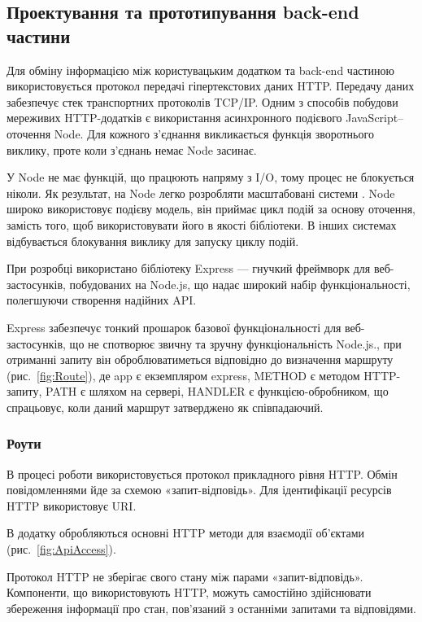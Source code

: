 \subsection{Проектування та прототипування back-end частини}

Для обміну інформацією між користувацьким додатком та back-end частиною використовується протокол передачі гіпертекстових даних HTTP. Передачу даних забезпечує стек транспортних протоколів TCP/IP.
Одним з способів побудови мереживих HTTP-додатків є використання  асинхронного подієвого JavaScript–оточення Node. Для кожного з’єднання викликається функція зворотнього виклику, проте коли з’єднань немає Node засинає.

У Node не має функцій, що працюють напряму з I/O, тому процес не блокується ніколи. Як результат, на Node легко розробляти масштабовані системи \cite{zeiss2015node}.
Node широко використовує подієву модель, він приймає цикл подій за основу оточення, замість того, щоб використовувати його в якості бібліотеки. В інших системах відбувається блокування виклику для запуску циклу подій.

При розробці використано бібліотеку Express — гнучкий фреймворк для веб-застосунків, побудованих на Node.js, що надає широкий набір функціональності, полегшуючи створення надійних API.

Express забезпечує тонкий прошарок базової функціональності для веб-застосунків, що не спотворює звичну та зручну функціональність Node.js., при отриманні запиту він оброблюватиметься відповідно до визначення маршруту (рис.~\ref{fig:Route}), де app є екземпляром express, METHOD є методом HTTP-запиту, PATH є шляхом на сервері, HANDLER є функцією-обробником, що спрацьовує, коли даний маршрут затверджено як співпадаючий.


\subsubsection{Роути}

В процесі роботи використовується протокол прикладного рівня HTTP. Обмін повідомленнями йде за схемою «запит-відповідь». Для ідентифікації ресурсів HTTP використовує URI. 

В додатку обробляються основні  HTTP методи для взаємодії об’єктами (рис.~\ref{fig:ApiAccess}). 

Протокол HTTP не зберігає свого стану між парами «запит-відповідь». Компоненти, що використовують HTTP, можуть самостійно здійснювати збереження інформації про стан, пов'язаний з останніми запитами та відповідями. 

